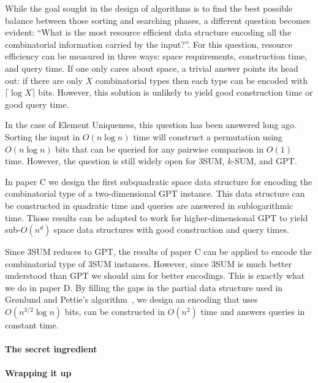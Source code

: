 While the goal sought in the design of algorithms is to find the best possible
balance between those sorting and searching phases, a different question becomes
evident: ``What is the most resource efficient data structure encoding all the
combinatorial information carried by the input?''. For this question, resource
efficiency can be measured in three ways: space requirements, construction
time, and query time. If one only cares about space, a trivial answer
points its head out: if there are only \(X\) combinatorial types then each type
can be encoded with \(\lceil \log X \rceil\) bits. However, this solution is
unlikely to yield good construction time or good query time.

In the case of Element Uniqueness, this question has been answered long ago.
Sorting the input in \(O(n \log n)\) time will construct a permutation using
\(O(n \log n)\) bits that can be queried for any pairwise comparison in
\(O(1)\) time. However, the question is still widely open for
3SUM, \(k\)-SUM, and GPT.

In paper C we design the first subquadratic space data structure for encoding
the combinatorial type of a two-dimensional GPT instance. This data structure
can be constructed in quadratic time and queries are answered in sublogarithmic
time. Those results can be adapted to work for higher-dimensional GPT to yield
sub-\(O(n^d)\) space data structures with good construction and query times.

Since 3SUM reduces to GPT, the results of paper C can be applied to encode the
combinatorial type of 3SUM instances. However, since 3SUM is much better
understood than GPT we should aim for better encodings. This is exactly what we
do in paper D. By filling the gaps in the partial data structure
used in Gr\o nlund and Pettie's algorithm~\cite{GP18}, we design an encoding
that uses \(O(n^{3/2} \log n)\) bits, can be constructed in \(O(n^2)\) time and
answers queries in constant time.


\paragraph{The secret ingredient}


\paragraph{Wrapping it up}

